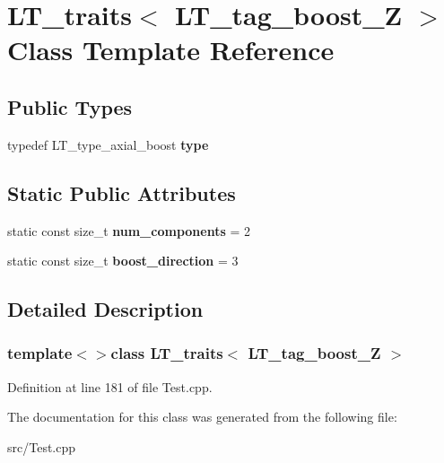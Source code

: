 \hypertarget{classLT__traits_3_01LT__tag__boost__Z_01_4}{}\section{L\+T\+\_\+traits$<$ L\+T\+\_\+tag\+\_\+boost\+\_\+\+Z $>$ Class Template Reference}
\label{classLT__traits_3_01LT__tag__boost__Z_01_4}
\subsection*{Public Types}
\begin{DoxyCompactItemize}
\item 
\hypertarget{classLT__traits_3_01LT__tag__boost__Z_01_4_a6bc261fcfb3ae4ea147a55824e5e4c71}{}typedef L\+T\+\_\+type\+\_\+axial\+\_\+boost {\bfseries type}\label{classLT__traits_3_01LT__tag__boost__Z_01_4_a6bc261fcfb3ae4ea147a55824e5e4c71}

\end{DoxyCompactItemize}
\subsection*{Static Public Attributes}
\begin{DoxyCompactItemize}
\item 
\hypertarget{classLT__traits_3_01LT__tag__boost__Z_01_4_af6d45b0e734facea863fb9c654df3bb5}{}static const size\+\_\+t {\bfseries num\+\_\+components} = 2\label{classLT__traits_3_01LT__tag__boost__Z_01_4_af6d45b0e734facea863fb9c654df3bb5}

\item 
\hypertarget{classLT__traits_3_01LT__tag__boost__Z_01_4_af26fb8e34bb8ab907775342002326f44}{}static const size\+\_\+t {\bfseries boost\+\_\+direction} = 3\label{classLT__traits_3_01LT__tag__boost__Z_01_4_af26fb8e34bb8ab907775342002326f44}

\end{DoxyCompactItemize}


\subsection{Detailed Description}
\subsubsection*{template$<$$>$class L\+T\+\_\+traits$<$ L\+T\+\_\+tag\+\_\+boost\+\_\+\+Z $>$}



Definition at line 181 of file Test.\+cpp.



The documentation for this class was generated from the following file\+:\begin{DoxyCompactItemize}
\item 
src/Test.\+cpp\end{DoxyCompactItemize}
